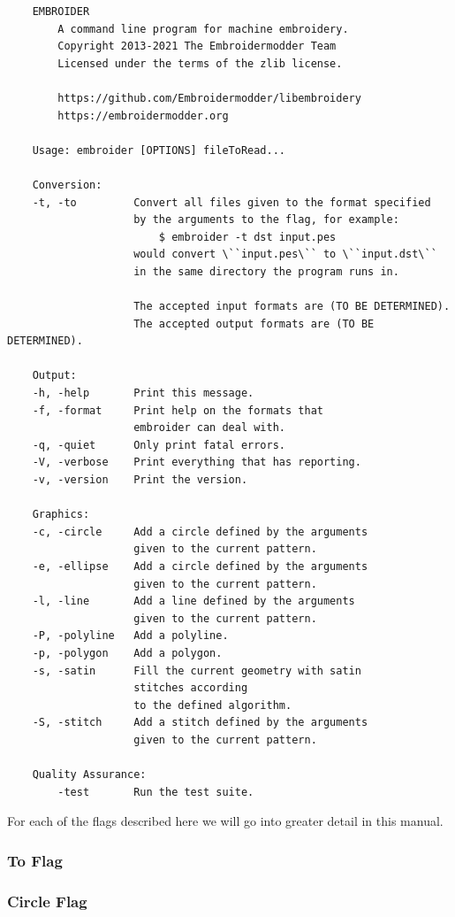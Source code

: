 \documentclass[a4paper, 11pt]{report}
\begin{document}
\begin{verbatim}
    EMBROIDER
        A command line program for machine embroidery.
        Copyright 2013-2021 The Embroidermodder Team
        Licensed under the terms of the zlib license.

        https://github.com/Embroidermodder/libembroidery
        https://embroidermodder.org

    Usage: embroider [OPTIONS] fileToRead...

    Conversion:
    -t, -to         Convert all files given to the format specified
                    by the arguments to the flag, for example:
                        $ embroider -t dst input.pes
                    would convert \``input.pes\`` to \``input.dst\``
                    in the same directory the program runs in.

                    The accepted input formats are (TO BE DETERMINED).
                    The accepted output formats are (TO BE DETERMINED).

    Output:
    -h, -help       Print this message.
    -f, -format     Print help on the formats that
                    embroider can deal with.
    -q, -quiet      Only print fatal errors.
    -V, -verbose    Print everything that has reporting.
    -v, -version    Print the version.

    Graphics:
    -c, -circle     Add a circle defined by the arguments
                    given to the current pattern.
    -e, -ellipse    Add a circle defined by the arguments
                    given to the current pattern.
    -l, -line       Add a line defined by the arguments
                    given to the current pattern.
    -P, -polyline   Add a polyline.
    -p, -polygon    Add a polygon.
    -s, -satin      Fill the current geometry with satin
                    stitches according
                    to the defined algorithm.
    -S, -stitch     Add a stitch defined by the arguments
                    given to the current pattern.

    Quality Assurance:
        -test       Run the test suite.
\end{verbatim}

For each of the flags described here we will go into greater detail in this manual.

\subsubsection{To Flag}

\subsubsection{Circle Flag}
\end{document}
